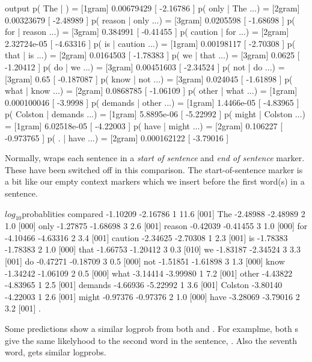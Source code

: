 \documentclass[a4paper,10pt,twoside]{report}
\begin{document}
\begin{wout}{\srilm{} output}
        p( The |  )               = [1gram] 0.00679429 [ -2.16786 ]
        p( only | The ...)        = [2gram] 0.00323679 [ -2.48989 ]
        p( reason | only ...)     = [3gram] 0.0205598 [ -1.68698 ]
        p( for | reason ...)      = [3gram] 0.384991 [ -0.41455 ]
        p( caution | for ...)     = [2gram] 2.32724e-05 [ -4.63316 ]
        p( is | caution ...)      = [1gram] 0.00198117 [ -2.70308 ]
        p( that | is ...)         = [2gram] 0.0164503 [ -1.78383 ]
        p( we | that ...)         = [3gram] 0.0625 [ -1.20412 ]
        p( do | we ...)           = [3gram] 0.00451603 [ -2.34524 ]
        p( not | do ...)          = [3gram] 0.65 [ -0.187087 ]
        p( know | not ...)        = [3gram] 0.024045 [ -1.61898 ]
        p( what | know ...)       = [2gram] 0.0868785 [ -1.06109 ]
        p( other | what ...)      = [1gram] 0.000100046 [ -3.9998 ]
        p( demands | other ...)   = [1gram] 1.4466e-05 [ -4.83965 ]
        p( Colston | demands ...) = [1gram] 5.8895e-06 [ -5.22992 ]
        p( might | Colston ...)   = [1gram] 6.02518e-05 [ -4.22003 ]
        p( have | might ...)      = [2gram] 0.106227 [ -0.973765 ]
        p( . | have ...)          = [2gram] 0.000162122 [ -3.79016 ]
\end{wout}

Normally, \srilm{} wraps each sentence in a \emph{start of sentence}
and \emph{end of sentence} marker. These have been switched off in
this comparison. The start-of-sentence marker is a bit like
our empty context markers which we insert before the first word(s) in
a sentence. 

\begin{wout}{$log_{10}$probablities compared}
-1.10209 -2.16786 1   11.6 [001] The
-2.48988 -2.48989 2    1.0 [000] only
-1.27875 -1.68698 3    2.6 [001] reason
-0.42039 -0.41455 3    1.0 [000] for
-4.10466 -4.63316 2    3.4 [001] caution
-2.34625 -2.70308 1    2.3 [001] is
-1.78383 -1.78383 2    1.0 [000] that
-1.66753 -1.20412 3    0.3 [010] we
-1.83187 -2.34524 3    3.3 [001] do
-0.47271 -0.18709 3    0.5 [000] not
-1.51851 -1.61898 3    1.3 [000] know
-1.34242 -1.06109 2    0.5 [000] what
-3.14414 -3.99980 1    7.2 [001] other
-4.43822 -4.83965 1    2.5 [001] demands
-4.66936 -5.22992 1    3.6 [001] Colston
-3.80140 -4.22003 1    2.6 [001] might
-0.97376 -0.97376 2    1.0 [000] have
-3.28069 -3.79016 2    3.2 [001] .
\end{wout}

Some predictions show a similar logprob from both \wopr{} and
\srilm{}. For examplme, both \lm{}s give the same likelyhood to the
second word in the sentence, . Also the seventh word,
 gets similar logprobs. 
\end{document}

